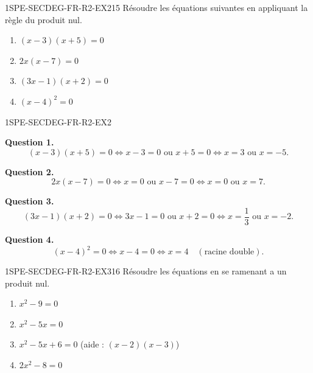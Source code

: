
\begin{exercice}{1SPE-SECDEG-FR-R2-EX2}{1}{5}
Résoudre les équations suivantes en appliquant la règle du produit nul.
\begin{enumerate}
  \item $(x - 3)(x + 5) = 0$
  \item $2x(x - 7) = 0$
  \item $(3x - 1)(x + 2) = 0$
  \item $(x - 4)^2 = 0$
\end{enumerate}
\end{exercice}


\begin{corrige}{1SPE-SECDEG-FR-R2-EX2}


\textbf{Question 1.}
\[
(x-3)(x+5) = 0 \Leftrightarrow x - 3 = 0 \text{ ou } x + 5 = 0 \Leftrightarrow x = 3 \text{ ou } x = -5.
\]

\textbf{Question 2.}
\[
2x(x-7) = 0 \Leftrightarrow x = 0 \text{ ou } x - 7 = 0 \Leftrightarrow x = 0 \text{ ou } x = 7.
\]

\textbf{Question 3.}
\[
(3x-1)(x+2) = 0 \Leftrightarrow 3x - 1 = 0 \text{ ou } x + 2 = 0 \Leftrightarrow x = \frac{1}{3} \text{ ou } x = -2.
\]


\textbf{Question 4.}
\[
(x-4)^2 = 0 \Leftrightarrow x - 4 = 0 \Leftrightarrow x = 4 \quad (\text{racine double}).
\]

\end{corrige}


\begin{exercice}{1SPE-SECDEG-FR-R2-EX3}{1}{6}
Résoudre les équations en se ramenant a un produit nul.
\begin{enumerate}
  \item $x^2 - 9 = 0$
  \item $x^2 - 5x = 0$
  \item $x^2 - 5x + 6 = 0$ \quad (aide : $(x-2)(x-3)$)
  \item $2x^2 - 8 = 0$
\end{enumerate}
\end{exercice}

